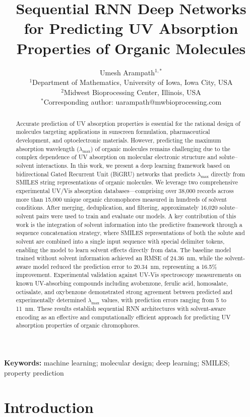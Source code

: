 \documentclass[11pt,a4paper]{article}
\title{Sequential RNN Deep Networks for Predicting UV Absorption Properties of Organic Molecules}
\author{
    Umesh Arampath$^{1,*}$ \\[0.5em]
    \small $^1$Department of Mathematics, University of Iowa, Iowa City, USA \\
    \small $^2$Midwest Bioprocessing Center, Illinois, USA \\[0.3em]
    \small $^*$Corresponding author: uarampath@mwbioprocessing.com
}
\date{}
\begin{document}
\maketitle

\begin{abstract}
Accurate prediction of UV absorption properties is essential for the rational design of molecules 
targeting applications in sunscreen formulation, pharmaceutical development, and optoelectronic 
materials. However, predicting the maximum absorption wavelength ($\lambda_{\max}$) of organic 
molecules remains challenging due to the complex dependence of UV absorption on molecular 
electronic structure and solute--solvent interactions. In this work, we present a deep learning 
framework based on bidirectional Gated Recurrent Unit (BiGRU) networks that predicts 
$\lambda_{\max}$ directly from SMILES string representations of organic molecules. We leverage 
two comprehensive experimental UV/Vis absorption databases---comprising over 38,000 records
across more than 15,000 unique organic chromophores measured in hundreds of solvent
conditions. After merging, deduplication, and filtering, approximately 16,020
solute--solvent pairs were used to train and evaluate our models. A key contribution of this work is the integration 
of solvent information into the predictive framework through a sequence concatenation strategy, 
where SMILES representations of both the solute and solvent are combined into a single input 
sequence with special delimiter tokens, enabling the model to learn solvent effects 
directly from data. The baseline model trained without solvent information achieved an RMSE of 
24.36~nm, while the solvent-aware model reduced the prediction error to 20.34~nm, representing 
a 16.5\% improvement. Experimental validation against UV-Vis spectroscopy measurements on 
known UV-absorbing compounds including avobenzone, ferulic acid, homosalate, octisalate, and 
oxybenzone demonstrated strong agreement between predicted and experimentally determined 
$\lambda_{\max}$ values, with prediction errors ranging from 5 to 11~nm. These results 
establish sequential RNN architectures with solvent-aware encoding as an effective and 
computationally efficient approach for predicting UV absorption properties of organic 
chromophores.
\end{abstract}

\noindent\textbf{Keywords:} machine learning; molecular design; deep learning; SMILES; property prediction

\section{Introduction}
\end{document}

